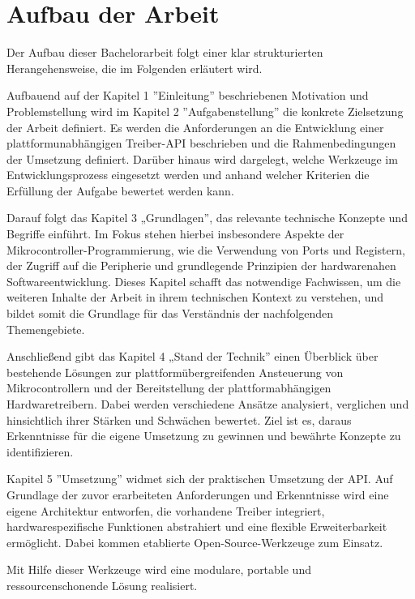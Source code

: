\section{Aufbau der Arbeit}
Der Aufbau dieser Bachelorarbeit folgt einer klar strukturierten Herangehensweise, die im Folgenden erläutert wird. 

Aufbauend auf der Kapitel 1 ''Einleitung'' beschriebenen Motivation und Problemstellung wird im Kapitel 2 ''Aufgabenstellung'' die konkrete Zielsetzung der Arbeit definiert.
Es werden die Anforderungen an die Entwicklung einer plattformunabhängigen Treiber-API beschrieben und die Rahmenbedingungen der Umsetzung definiert.
Darüber hinaus wird dargelegt, welche Werkzeuge im Entwicklungsprozess eingesetzt werden und anhand welcher Kriterien die Erfüllung der Aufgabe bewertet werden kann.

Darauf folgt das Kapitel 3 „Grundlagen”, das relevante technische Konzepte und Begriffe einführt. 
Im Fokus stehen hierbei insbesondere Aspekte der Mikrocontroller-Programmierung, wie die Verwendung von Ports und Registern, der Zugriff auf die Peripherie und grundlegende Prinzipien der hardwarenahen Softwareentwicklung. 
Dieses Kapitel schafft das notwendige Fachwissen, um die weiteren Inhalte der Arbeit in ihrem technischen Kontext zu verstehen, und bildet somit die Grundlage für das Verständnis der nachfolgenden Themengebiete.

Anschließend gibt das Kapitel 4 „Stand der Technik” einen Überblick über bestehende Lösungen zur plattformübergreifenden Ansteuerung von Mikrocontrollern und der Bereitstellung der plattformabhängigen Hardwaretreibern.
Dabei werden verschiedene Ansätze analysiert, verglichen und hinsichtlich ihrer Stärken und Schwächen bewertet. 
Ziel ist es, daraus Erkenntnisse für die eigene Umsetzung zu gewinnen und bewährte Konzepte zu identifizieren.

Kapitel 5 ''Umsetzung'' widmet sich der praktischen Umsetzung der API.
Auf Grundlage der zuvor erarbeiteten Anforderungen und Erkenntnisse wird eine eigene Architektur entworfen, die vorhandene Treiber integriert, hardwarespezifische Funktionen abstrahiert und eine flexible Erweiterbarkeit ermöglicht.
Dabei kommen etablierte Open-Source-Werkzeuge zum Einsatz.

Mit Hilfe dieser Werkzeuge wird eine modulare, portable und ressourcenschonende Lösung realisiert.






















